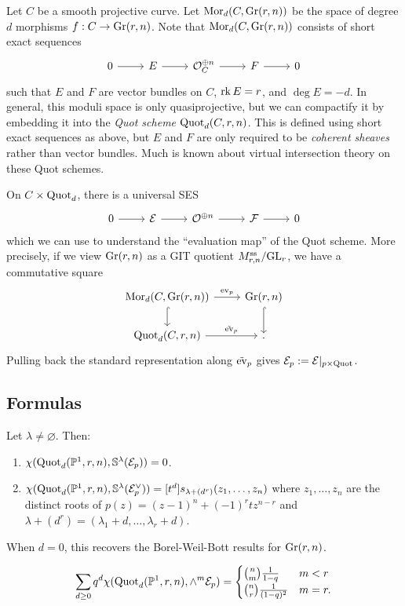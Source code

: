 \documentclass{article}
\begin{document}
Let $C$ be a smooth projective curve.
Let $\operatorname{Mor}_d(C, \operatorname{Gr}(r, n))$ be the space of degree $d$ morphisms $f: C \to \operatorname{Gr}(r, n)$.
Note that	$\operatorname{Mor}_d(C, \operatorname{Gr}(r, n))$ consists of short exact sequences
\[
  \SES{E}{\Oc_C^{\oplus n}}{F}
\]
such that $E$ and $F$ are vector bundles on $C$, $\operatorname{rk} E = r$, and $\deg E = -d$.
In general, this moduli space is only quasiprojective, but we can compactify it by embedding it into the \emph{Quot scheme} $\operatorname{Quot}_d(C, r, n)$.
This is defined using short exact sequences as above, but $E$ and $F$ are only required to be \emph{coherent sheaves} rather than vector bundles.
Much is known about virtual intersection theory on these Quot schemes.

On $C \times \operatorname{Quot}_d$, there is a universal SES
\[
	\SES{\Ec}{\Oc^{\oplus n}}{\Fc}
\]
which we can use to understand the ``evaluation map'' of the Quot scheme.
More precisely, if we view $\operatorname{Gr}(r, n)$ as a GIT quotient $M_{r,n}^{\mathrm{ss}} / \mathrm{GL}_r$, we have a commutative square
\[
	\begin{tikzcd}
		\Mor_d(C, \Gr(r, n)) \rar["\ev_p"] \dar[hook] & \Gr(r, n) \dar[hook] \\
		\Quot_d(C, r, n) \rar["\tilde{\ev}_p"] & [M_{r,n} / \GL_r].
	\end{tikzcd}
\]
Pulling back the standard representation along $\tilde{\operatorname{ev}}_p$ gives $\mathcal{E}_p := \mathcal{E}|_{p \times \operatorname{Quot}}$.

\subsection{Formulas}

\begin{thm}
	Let $\lambda \neq \varnothing$.
	Then:
	\begin{enumerate}
		\item $\chi(\operatorname{Quot}_d(\mathbb{P}^1, r, n), \mathbb{S}^\lambda(\mathcal{E}_p)) = 0$.
		\item $\chi(\operatorname{Quot}_d(\mathbb{P}^1, r, n), \mathbb{S}^\lambda(\mathcal{E}_p^\vee)) = [t^d] s_{\lambda + (d^r)}(z_1, \dots, z_n)$ where $z_1, \dots, z_n$ are the distinct roots of $p(z) = (z - 1)^n + (-1)^r t z^{n-r}$ and $\lambda + (d^r) = (\lambda_1 + d, \dots, \lambda_r + d)$.
	\end{enumerate}
\end{thm}

\begin{ex}
	When $d = 0$, this recovers the Borel-Weil-Bott results for $\operatorname{Gr}(r, n)$.
\end{ex}

\begin{ex}
	\[
		\sum_{d \geq 0} q^d \chi(\operatorname{Quot}_d(\mathbb{P}^1, r, n), \wedge^m \mathcal{E}_p) = \begin{cases}
			\binom{n}{m} \frac{1}{1 - q} & m < r \\
			\binom{n}{r} \frac{1}{(1 - q)^2} & m = r.
		\end{cases}
	\]
\end{ex}
\end{document}
